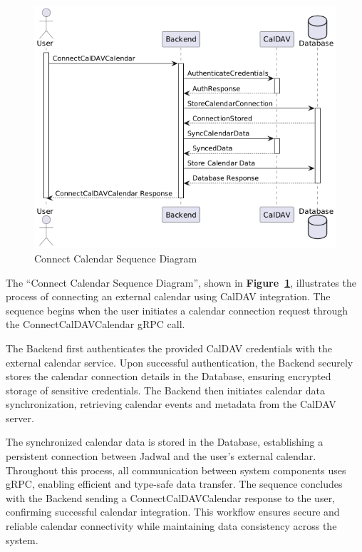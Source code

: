 \begin{figure}[!h]
  \centering
  \includegraphics[width=\textwidth]{images/docs/diagrams/sequence-diagrams/all-sequence-diagrams/Connect Calendar.png}
  \caption{Connect Calendar Sequence Diagram}
  \label{fig:seq/connect-calendar}
\end{figure}

The ``Connect Calendar Sequence Diagram'', shown in \textbf{Figure~\ref{fig:seq/connect-calendar}}, illustrates the process of connecting an external calendar using CalDAV integration. The sequence begins when the user initiates a calendar connection request through the ConnectCalDAVCalendar gRPC call.

The Backend first authenticates the provided CalDAV credentials with the external calendar service. Upon successful authentication, the Backend securely stores the calendar connection details in the Database, ensuring encrypted storage of sensitive credentials. The Backend then initiates calendar data synchronization, retrieving calendar events and metadata from the CalDAV server.

The synchronized calendar data is stored in the Database, establishing a persistent connection between Jadwal and the user's external calendar. Throughout this process, all communication between system components uses gRPC, enabling efficient and type-safe data transfer. The sequence concludes with the Backend sending a ConnectCalDAVCalendar response to the user, confirming successful calendar integration. This workflow ensures secure and reliable calendar connectivity while maintaining data consistency across the system.